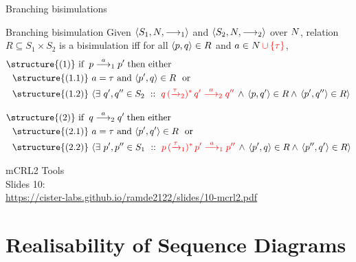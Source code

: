 \documentclass[aspectratio=169]{beamer}
\begin{document}
\begin{slide}{Branching bisimulations}
\small
{}


\begin{block}{Branching bisimulation}
Given  $\mathopen{\langle}S_1, N,  \longrightarrow_1\mathclose{\rangle}$  and $\mathopen{\langle}S_2, N, \longrightarrow_2\mathclose{\rangle}$ over $N$,
relation $R \subseteq S_1 \times S_2$ is a \alert{bisimulation} iff for all $\mathopen{\langle}p,q\mathclose{\rangle} \in R$ and $a \in N\,\textcolor{red}{\cup\left\{ \tau \right\}}$,
%
\begin{align*}\small
&\text{\structure{(1)} if}\; \;   p \rtran{a}_1 p'\; \text{then either}
  \\&~~
  \text{\structure{(1.1)}~} a=\tau \text{~and~}\pair{p',q}\in R \text{~~or}
  \\&~~
  \text{\structure{(1.2)}~}
    \rcb{\exists}{q',q'' \in S_2}{}{\rdb{q \,(\trans{\tau}_2)^{*}\,q' \tran{a}_2  q''}\, \e\,
    \pair{p,q'} \in R \e\,
    \pair{p',q''} \in R} \\[3mm]
&\text{\structure{(2)} if}\; \;   q \rtran{a}_2 q'\; \text{then either}
  \\&~~
  \text{\structure{(2.1)}~} a=\tau \text{~and~}\pair{p',q'}\in R \text{~~or}
  \\&~~
  \text{\structure{(2.2)}~}
    \rcb{\exists}{p',p'' \in S_1}{}{\rdb{p \,(\trans{\tau}_1)^{*}\,p' \tran{a}_1  p''}\, \e\,
    \pair{p',q} \in R \e\,
    \pair{p'',q'} \in R}
\end{align*}
\end{block}
\end{slide}



\begin{frame}
  \huge\centering
  mCRL2 Tools
  \\[5mm]\large
  Slides 10:\\\url{https://cister-labs.github.io/ramde2122/slides/10-mcrl2.pdf}
\end{frame}

\section{Realisability of Sequence Diagrams}
\end{document}
